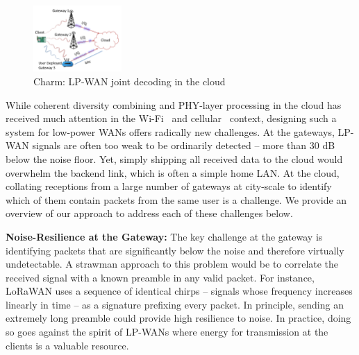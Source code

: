 \begin{figure}
    \centering
    \includegraphics[width=0.30\textwidth]{figures/LoRaRAN.pdf}
        \vspace*{-0.1in}
    \caption{Charm: LP-WAN joint decoding in the cloud}
    \vspace*{-0.1in}
    \label{fig:my_label}
    \compactimg
\end{figure}




While coherent diversity combining and PHY-layer processing in the cloud has received much attention in the Wi-Fi~\cite{tan2009sam, xie2014scalable} and cellular~\cite{checko2015cloud, wubben2014benefits} context, designing such a system for low-power WANs offers radically new challenges. At the gateways,  LP-WAN signals are often too weak to be ordinarily detected -- more than 30 dB below the noise floor. Yet, simply shipping all received data to the cloud would overwhelm the backend link, which is often  a simple home LAN. At the cloud, collating receptions from a large number of gateways at city-scale to identify which of them contain packets from the same user is a challenge. We provide an overview of our approach to address each of these challenges below. 


\textbf{Noise-Resilience at the Gateway:} The key challenge at the gateway is identifying packets that are significantly below the noise and therefore virtually undetectable. A strawman approach to this problem would be to correlate the received signal with a known preamble in any valid packet. For instance, LoRaWAN uses a sequence of identical chirps -- signals whose frequency increases linearly in time -- as a signature prefixing every packet. In principle, sending an extremely long preamble could provide high resilience to noise. In practice, doing so goes against the spirit of LP-WANs where energy for transmission at the clients is a valuable resource. 

